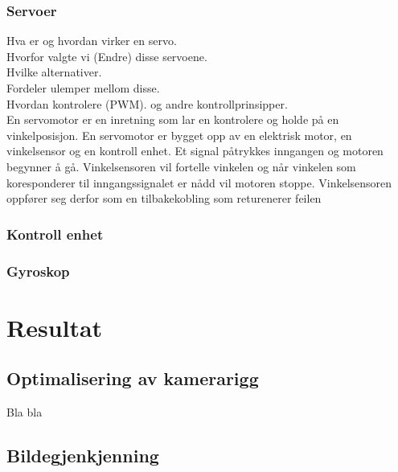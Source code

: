 \documentclass[a4paper, 11pt]{article}
\begin{document}
\subsubsection{Servoer}
Hva er og hvordan virker en servo. \\
Hvorfor valgte vi (Endre) disse servoene. \\
Hvilke alternativer. \\
Fordeler ulemper mellom disse. \\
Hvordan kontrolere (PWM). og andre kontrollprinsipper. \\

En servomotor er en inretning som lar en kontrolere og holde på en vinkelposisjon. En servomotor er bygget opp av en elektrisk motor, en vinkelsensor og en kontroll enhet. Et signal påtrykkes inngangen og motoren begynner å gå. Vinkelsensoren vil fortelle vinkelen og når vinkelen som koresponderer til inngangssignalet er nådd vil motoren stoppe. Vinkelsensoren oppfører seg derfor som en tilbakekobling som returenerer feilen    

\subsubsection{Kontroll enhet}
\subsubsection{Gyroskop}

\begin{malsetning}

\end{malsetning}


 \newpage
\section{Resultat}

\subsection{Optimalisering av kamerarigg}
Bla bla
\begin{rigg}

\end{rigg}
\subsection{Bildegjenkjenning}
\end{document}
